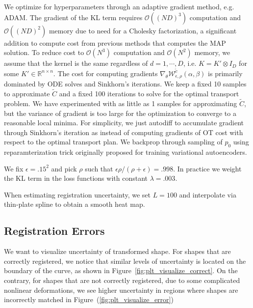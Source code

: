 \documentclass{6838publ}
\newcommand\sO{\ensuremath{\mathcal{O}}}
\newcommand\sW{\ensuremath{\mathcal{W}}}
\newcommand\R{\ensuremath{\mathbb{R}}} %
\begin{document}
We optimize for hyperparameters through an adaptive gradient method, e.g. ADAM. The gradient of the KL term requires $\sO((ND)^3)$ computation and $\sO((ND)^2)$ memory due to need for a Cholesky factorization, a significant addition to compute cost from previous methods that computes the MAP solution. To reduce cost to $\sO(N^3)$ computation and $\sO(N^2)$ memory, we assume that the kernel is the same regardless of $d=1,\cdots,D$, i.e. $K=K'\otimes I_D$ for some $K'\in\R^{n\times n}$. The cost for computing gradients $\nabla_{\theta} \sW_{\epsilon,\rho}^{\widetilde{c}}(\alpha,\beta)$ is primarily dominated by ODE solves and Sinkhorn's iterations. We keep a fixed 10 samples to approximate $\widetilde{C}$ and a fixed 100 iterations to solve for the optimal transport problem. We have experimented with as little as 1 samples for approximating $\widetilde{C}$, but the variance of gradient is too large for the optimization to converge to a reasonable local minima. For simplicity, we just autodiff to accumulate gradient through Sinkhorn's iteration as \cite{genevayLearningGenerativeModels2018} instead of computing gradients of OT cost with respect to the optimal transport plan. We backprop through sampling of $p_0$ using reparamterization trick originally proposed for training variational autoencoders.

We fix $\epsilon=.15^2$ and pick $\rho$ such that $\epsilon\rho/(\rho+\epsilon) = .998$. In practice we weight the KL term in the loss functions with constant $\lambda = .003$.

When estimating registration uncertainty, we set $L=100$ and interpolate via thin-plate spline to obtain a smooth heat map.


\subsection{Registration Errors}

We want to visualize uncertainty of transformed shape. For shapes that are correctly registered, we notice that similar levels of uncertainty is located on the boundary of the curve, as shown in Figure~\ref{fig:plt_visualize_correct}. On the contrary, for shapes that are not correctly registered, due to some complicated nonlinear deformations, we see higher uncertainty in regions where shapes are incorrectly matched in Figure~(\ref{fig:plt_visualize_error})


\newpage
\newpage



\end{document}

